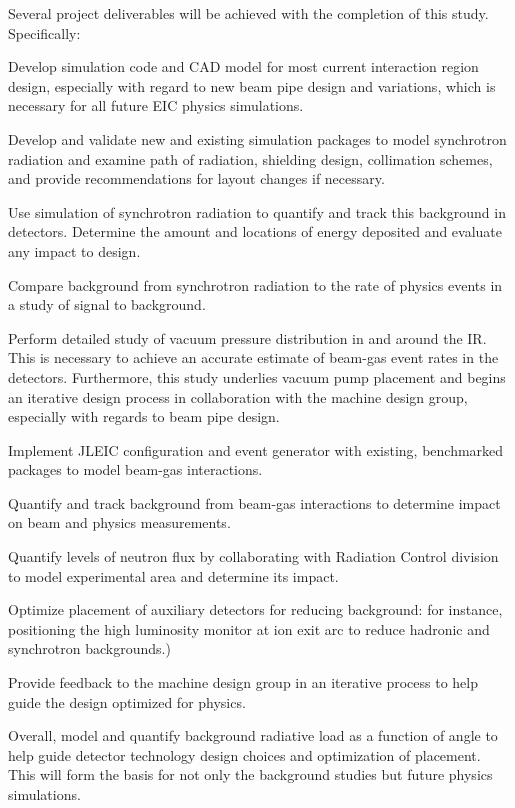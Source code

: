Several project deliverables will be achieved with the completion of this study.  Specifically:
\begin{itemize}[label=\textbullet]
	
		\litem{} Develop simulation code and CAD model for most current interaction region design, especially with regard to new beam pipe design and variations, which is necessary for all future EIC physics simulations. 
	
		\litem{}Develop and validate new and existing simulation packages to model synchrotron radiation and examine path of radiation, shielding design, collimation schemes, and provide recommendations for layout changes if necessary. 
		
		\litem{} Use simulation of synchrotron radiation to quantify and track this background in detectors.  Determine the amount and locations of energy deposited and evaluate any impact to  design.
		
		\litem{} Compare background from synchrotron radiation to the rate of physics events in a study of signal to background. 
		
		\litem{} Perform detailed study of vacuum pressure distribution in and around the IR.  This is necessary to achieve an accurate estimate of beam-gas event rates in the detectors.  Furthermore, this study underlies vacuum pump placement and begins an iterative design process in collaboration with the machine design group, especially with regards to beam pipe design.
		
		\litem{} Implement JLEIC configuration and event generator with existing, benchmarked packages to model beam-gas interactions.
		
		\litem{} Quantify and track background from beam-gas interactions to determine impact on beam and physics measurements.
		
		\litem{} Quantify levels of neutron flux by collaborating with Radiation Control division to model experimental area and determine its impact. 
		
		\litem{} Optimize placement of auxiliary detectors for reducing background: for instance, positioning the high luminosity monitor at ion exit arc to reduce hadronic and synchrotron backgrounds.)
					
		\litem{} Provide feedback to the machine design group in an iterative process to help guide the design optimized for physics.
		
		\litem{} Overall, model and quantify background radiative load as a function of angle to help guide detector technology design choices and optimization of placement.  This will form the basis for not only the background studies but future physics simulations.  
	
	\end{itemize}